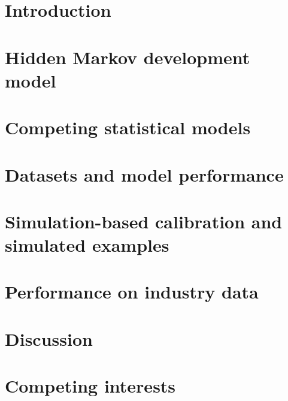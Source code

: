 \documentclass[12pt]{article}
\begin{document}
\maketitle



\section{Introduction}
\label{sec:introduction}


\section{Hidden Markov development model}


\section{Competing statistical models}


\section{Datasets and model performance}


\section{Simulation-based calibration and simulated examples}


\section{Performance on industry data}
\label{sec:results}


\section{Discussion}
\label{sec:discussion}


\section{Competing interests}
\label{sec:interests}




\end{document}
